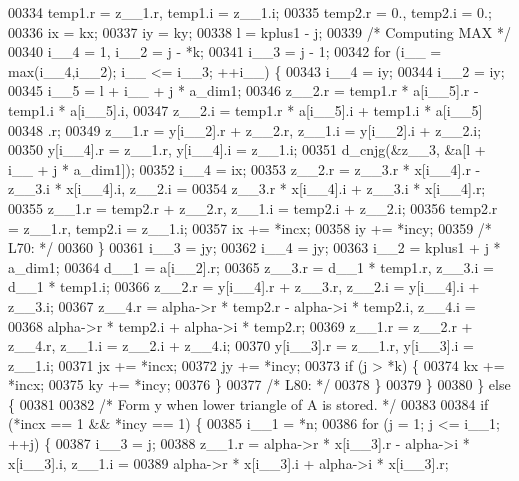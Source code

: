 \begin{DoxyCode}
00334         temp1.r = z\_\_1.r, temp1.i = z\_\_1.i;
00335         temp2.r = 0., temp2.i = 0.;
00336         ix = kx;
00337         iy = ky;
00338         l = kplus1 - j;
00339 \textcolor{comment}{/* Computing MAX */}
00340         i\_\_4 = 1, i\_\_2 = j - *k;
00341         i\_\_3 = j - 1;
00342         \textcolor{keywordflow}{for} (i\_\_ = max(i\_\_4,i\_\_2); i\_\_ <= i\_\_3; ++i\_\_) \{
00343             i\_\_4 = iy;
00344             i\_\_2 = iy;
00345             i\_\_5 = l + i\_\_ + j * a\_dim1;
00346             z\_\_2.r = temp1.r * a[i\_\_5].r - temp1.i * a[i\_\_5].i, 
00347                 z\_\_2.i = temp1.r * a[i\_\_5].i + temp1.i * a[i\_\_5]
00348                 .r;
00349             z\_\_1.r = y[i\_\_2].r + z\_\_2.r, z\_\_1.i = y[i\_\_2].i + z\_\_2.i;
00350             y[i\_\_4].r = z\_\_1.r, y[i\_\_4].i = z\_\_1.i;
00351             d\_cnjg(&z\_\_3, &a[l + i\_\_ + j * a\_dim1]);
00352             i\_\_4 = ix;
00353             z\_\_2.r = z\_\_3.r * x[i\_\_4].r - z\_\_3.i * x[i\_\_4].i, z\_\_2.i =
00354                  z\_\_3.r * x[i\_\_4].i + z\_\_3.i * x[i\_\_4].r;
00355             z\_\_1.r = temp2.r + z\_\_2.r, z\_\_1.i = temp2.i + z\_\_2.i;
00356             temp2.r = z\_\_1.r, temp2.i = z\_\_1.i;
00357             ix += *incx;
00358             iy += *incy;
00359 \textcolor{comment}{/* L70: */}
00360         \}
00361         i\_\_3 = jy;
00362         i\_\_4 = jy;
00363         i\_\_2 = kplus1 + j * a\_dim1;
00364         d\_\_1 = a[i\_\_2].r;
00365         z\_\_3.r = d\_\_1 * temp1.r, z\_\_3.i = d\_\_1 * temp1.i;
00366         z\_\_2.r = y[i\_\_4].r + z\_\_3.r, z\_\_2.i = y[i\_\_4].i + z\_\_3.i;
00367         z\_\_4.r = alpha->r * temp2.r - alpha->i * temp2.i, z\_\_4.i = 
00368             alpha->r * temp2.i + alpha->i * temp2.r;
00369         z\_\_1.r = z\_\_2.r + z\_\_4.r, z\_\_1.i = z\_\_2.i + z\_\_4.i;
00370         y[i\_\_3].r = z\_\_1.r, y[i\_\_3].i = z\_\_1.i;
00371         jx += *incx;
00372         jy += *incy;
00373         \textcolor{keywordflow}{if} (j > *k) \{
00374             kx += *incx;
00375             ky += *incy;
00376         \}
00377 \textcolor{comment}{/* L80: */}
00378         \}
00379     \}
00380     \} \textcolor{keywordflow}{else} \{
00381 
00382 \textcolor{comment}{/*        Form  y  when lower triangle of A is stored. */}
00383 
00384     \textcolor{keywordflow}{if} (*incx == 1 && *incy == 1) \{
00385         i\_\_1 = *n;
00386         \textcolor{keywordflow}{for} (j = 1; j <= i\_\_1; ++j) \{
00387         i\_\_3 = j;
00388         z\_\_1.r = alpha->r * x[i\_\_3].r - alpha->i * x[i\_\_3].i, z\_\_1.i =
00389              alpha->r * x[i\_\_3].i + alpha->i * x[i\_\_3].r;

\end{DoxyCode}
